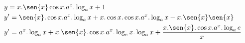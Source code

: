\begin{ex}
\begin{align}
&y=x.\sen{x}\cos{x}.a^x.\log_{a}{x}+1\nonumber\\
&y'=\sen{x}.\cos{x}.a^x.\log_{a}{x}+x.\cos{x}.\cos{x}.a^x.\log_{a}{x}-x.\sen{x}\sen{x}\nonumber\\
&y'=a^x.\log_{a}{x}+x.\sen{x}.\cos{x}.a^x.\log_{e}{x}.\log_{a}{x}+\frac{x.\sen{x}.\cos{x}.a^x.\log_{a}{e}}{x}\nonumber
\end{align}
\end{ex}